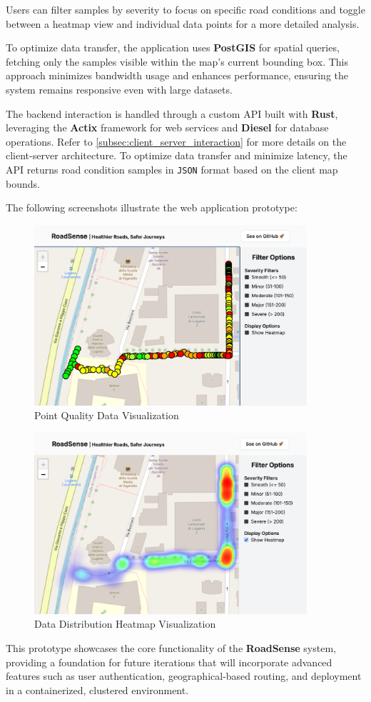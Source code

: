 \noindent Users can filter samples by severity to focus on specific road conditions and toggle between a heatmap view and individual data points for a more detailed analysis.

To optimize data transfer, the application uses \textbf{PostGIS} for spatial queries, fetching only the samples visible within the map's current bounding box. This approach minimizes bandwidth usage and enhances performance, ensuring the system remains responsive even with large datasets.

The backend interaction is handled through a custom API built with \textbf{Rust}, leveraging the \textbf{Actix} framework for web services and \textbf{Diesel} for database operations. Refer to \autoref{subsec:client_server_interaction} for more details on the client-server architecture. To optimize data transfer and minimize latency, the API returns road condition samples in \texttt{JSON} format based on the client map bounds. 

The following screenshots illustrate the web application prototype:

\begin{figure}[H]
	\centering
	\includegraphics[width=0.9\textwidth]{../../assets/images/roadsense_webapp_points.png}
	\caption{Point Quality Data Visualization}
	\label{fig:point_quality_data}
\end{figure}

\begin{figure}[H]
	\centering
	\includegraphics[width=0.9\textwidth]{../../assets/images/roadsense_webapp_heat.png}
	\caption{Data Distribution Heatmap Visualization}
	\label{fig:data_distribution_heatmap}
\end{figure}


This prototype showcases the core functionality of the \textbf{RoadSense} system, providing a foundation for future iterations that will incorporate advanced features such as user authentication, geographical-based routing, and deployment in a containerized, clustered environment.
